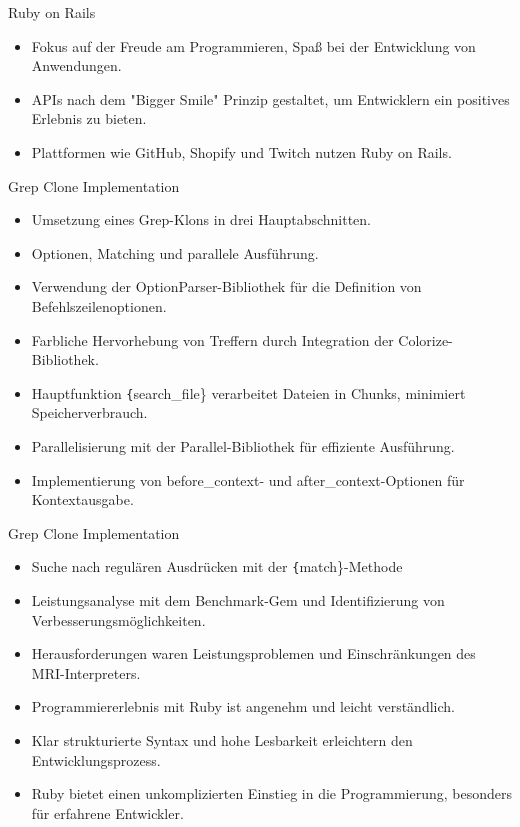 \documentclass{beamer}
\begin{document}
\begin{frame}{Ruby on Rails}
  \begin{itemize}
  \item Fokus auf der Freude am Programmieren, Spaß bei der Entwicklung von Anwendungen.
    \item APIs nach dem "Bigger Smile" Prinzip gestaltet, um Entwicklern ein positives Erlebnis zu bieten.
    \item Plattformen wie GitHub, Shopify und Twitch nutzen Ruby on Rails.
  \end{itemize}
\end{frame}
\begin{frame}{Grep Clone Implementation}
  \begin{itemize}
    \item Umsetzung eines Grep-Klons in drei Hauptabschnitten.
    \item Optionen, Matching und parallele Ausführung.
    \item Verwendung der OptionParser-Bibliothek für die Definition von Befehlszeilenoptionen.
    \item Farbliche Hervorhebung von Treffern durch Integration der Colorize-Bibliothek.
    \item Hauptfunktion \texttt\{search\_file\} verarbeitet Dateien in Chunks, minimiert Speicherverbrauch.
    \item Parallelisierung mit der Parallel-Bibliothek für effiziente Ausführung.
    \item Implementierung von before\_context- und after\_context-Optionen für Kontextausgabe.
   
  \end{itemize}
\end{frame}
\begin{frame}{Grep Clone Implementation}
  \begin{itemize}
    
    \item Suche nach regulären Ausdrücken mit der \texttt\{match\}-Methode
    \item Leistungsanalyse mit dem Benchmark-Gem und Identifizierung von Verbesserungsmöglichkeiten.
    \item Herausforderungen waren Leistungsproblemen und Einschränkungen des MRI-Interpreters.
    \item Programmiererlebnis mit Ruby ist angenehm und leicht verständlich.
    \item Klar strukturierte Syntax und hohe Lesbarkeit erleichtern den Entwicklungsprozess.
    \item Ruby bietet einen unkomplizierten Einstieg in die Programmierung, besonders für erfahrene Entwickler.
  \end{itemize}
\end{frame}
\end{document}
